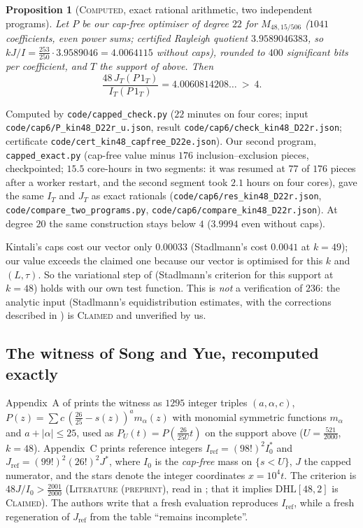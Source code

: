 \documentclass[11pt]{amsart}
\newtheorem{proposition}[theorem]{Proposition}
\theoremstyle{definition}
\theoremstyle{remark}
\newcommand{\lbl}[1]{\textup{\textsc{#1}}}
\newcommand{\DHL}{\mathrm{DHL}}
\begin{document}
\begin{proposition}[\lbl{Computed}, exact rational arithmetic, two independent programs]\label{prop:kin-capped}
Let $P$ be our cap-free optimiser of degree $22$ for $M_{48,15/506}$ ($1041$
coefficients, even power sums; certified Rayleigh quotient $3.9589046383$, so
$kJ/I=\frac{253}{250}\cdot3.9589046=4.0064115$ without caps), rounded to
$400$ significant bits per coefficient, and $T$ the support of \cite{Kin26}
above. Then
\[
\frac{48\,J_T(P\,1_T)}{I_T(P\,1_T)}=4.0060814208\ldots\ >\ 4 .
\]
\end{proposition}
\begin{sloppypar}
Computed by \texttt{code/capped\_check.py} ($22$ minutes on four cores; input
\texttt{code/cap6/P\_kin48\_D22r\_u.json}, result
\texttt{code/cap6/check\_kin48\_D22r.json}; certificate
\texttt{code/cert\_kin48\_capfree\_D22e.json}). Our second program, \texttt{capped\_exact.py}
(cap-free value minus $176$ inclusion--exclusion pieces, checkpointed;
$15.5$ core-hours in two segments: it was resumed at $77$ of $176$ pieces after
a worker restart, and the second segment took $2.1$ hours on four cores), gave the same $I_T$ and
$J_T$ as exact rationals (\texttt{code/cap6/res\_kin48\_D22r.json},
\texttt{code/compare\_two\_programs.py},
\texttt{code/cap6/compare\_kin48\_D22r.json}).
At degree $20$ the
same construction stays below $4$ ($3.9994$ even without caps).
\end{sloppypar}
Kintali's caps cost our vector only $0.00033$ (Stadlmann's cost $0.0041$ at
$k=49$); our value exceeds the claimed one because our vector is optimised for
this $k$ and $(L,\tau)$. So the variational step of \cite{Kin26}
(Stadlmann's criterion for this support at $k=48$) holds with our own test
function. This is \emph{not} a verification of $236$: the analytic input
(Stadlmann's equidistribution estimates, with the corrections described in
\cite{Kin26}) is \lbl{Claimed} and unverified by us.

\subsection*{The witness of Song and Yue, recomputed exactly}
Appendix~A of \cite{SY26} prints the witness as $1295$ integer triples
$(a,\alpha,c)$, $P(z)=\sum c\,(\frac{26}{25}-s(z))^{a}m_\alpha(z)$ with
monomial symmetric functions $m_\alpha$ and $a+|\alpha|\le25$, used as
$P_U(t)=P(\frac{26}{25U}t)$ on the support above ($U=\frac{521}{2000}$, $k=48$).
Appendix~C prints reference integers $I_{\mathrm{ref}}=(98!)^2I_0^{*}$ and
$J_{\mathrm{ref}}=(99!)^2(26!)^2J^{*}$, where $I_0$ is the \emph{cap-free}
mass on $\{s<U\}$, $J$ the capped numerator, and the stars denote the integer
coordinates $x=10^4t$. The criterion is $48J/I_0>\frac{2001}{2000}$
(\lbl{Literature (preprint)}, read in \cite[\S4.12, App.~C]{SY26}; that it
implies $\DHL[48,2]$ is \lbl{Claimed}). The authors write
that a fresh evaluation reproduces $I_{\mathrm{ref}}$, while a fresh
regeneration of $J_{\mathrm{ref}}$ from the table ``remains incomplete''.
\end{document}
